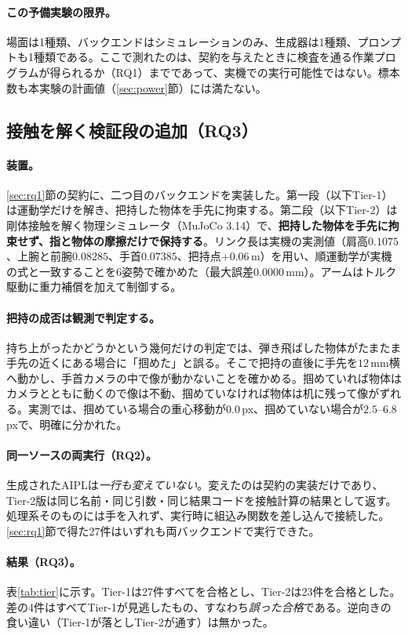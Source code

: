 \documentclass[10pt,letterpaper]{article}
\begin{document}
\paragraph{この予備実験の限界。}場面は1種類、バックエンドはシミュレーションのみ、生成器は1種類、プロンプトも1種類である。ここで測れたのは、契約を与えたときに検査を通る作業プログラムが得られるか（RQ1）までであって、実機での実行可能性ではない。標本数も本実験の計画値（\ref{sec:power}節）には満たない。

\subsection{接触を解く検証段の追加（RQ3）}\label{sec:tier}
\paragraph{装置。}\ref{sec:rq1}節の契約に、二つ目のバックエンドを実装した。第一段（以下Tier-1）は運動学だけを解き、把持した物体を手先に拘束する。第二段（以下Tier-2）は剛体接触を解く物理シミュレータ（MuJoCo 3.14）で、\textbf{把持した物体を手先に拘束せず、指と物体の摩擦だけで保持する}。リンク長は実機の実測値（肩高$0.1075$、上腕と前腕$0.08285$、手首$0.07385$、把持点$+0.06$\,m）を用い、順運動学が実機の式と一致することを6姿勢で確かめた（最大誤差$0.0000$\,mm）。アームはトルク駆動に重力補償を加えて制御する。

\paragraph{把持の成否は観測で判定する。}持ち上がったかどうかという幾何だけの判定では、弾き飛ばした物体がたまたま手先の近くにある場合に「掴めた」と誤る。そこで把持の直後に手先を$12$\,mm横へ動かし、手首カメラの中で像が動かないことを確かめる。掴めていれば物体はカメラとともに動くので像は不動、掴めていなければ物体は机に残って像がずれる。実測では、掴めている場合の重心移動が$0.0$\,px、掴めていない場合が$2.5$--$6.8$\,pxで、明確に分かれた。

\paragraph{同一ソースの両実行（RQ2）。}生成されたAIPLは\emph{一行も変えていない}。変えたのは契約の実装だけであり、Tier-2版は同じ名前・同じ引数・同じ結果コードを接触計算の結果として返す。処理系そのものには手を入れず、実行時に組込み関数を差し込んで接続した。\ref{sec:rq1}節で得た27件はいずれも両バックエンドで実行できた。

\paragraph{結果（RQ3）。}表\ref{tab:tier}に示す。Tier-1は27件すべてを合格とし、Tier-2は23件を合格とした。差の4件はすべてTier-1が見逃したもの、すなわち\emph{誤った合格}である。逆向きの食い違い（Tier-1が落としTier-2が通す）は無かった。
\end{document}
